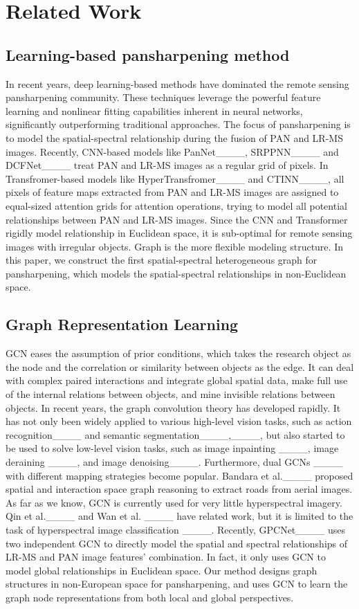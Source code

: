 \section{Related Work}
\subsection{Learning-based pansharpening method}

In recent years, deep learning-based methods have dominated the remote sensing pansharpening community. These techniques leverage the powerful feature learning and nonlinear fitting capabilities inherent in neural networks, significantly outperforming traditional approaches. The focus of pansharpening is to model the spatial-spectral relationship during the fusion of PAN and LR-MS images. Recently, CNN-based models like PanNet____, SRPPNN____ and DCFNet____ treat PAN and LR-MS images as a regular grid of pixels. In Transfromer-based models like HyperTransfromer____ and CTINN____, all pixels of feature maps extracted from PAN and LR-MS images are assigned to equal-sized attention grids
for attention operations, trying to model all potential relationships between PAN and LR-MS images. Since the CNN and Transformer rigidly model relationship in Euclidean space, it is sub-optimal for remote sensing images with irregular objects. Graph is the more flexible modeling structure. In this paper, we construct the first spatial-spectral heterogeneous graph for pansharpening, which models the spatial-spectral relationships in non-Euclidean space.

\subsection{Graph Representation Learning}
GCN eases the assumption of prior conditions, which takes the research object as the node and the correlation or similarity between objects as the edge. It can deal with complex paired interactions and integrate global spatial data, make full use of the internal relations between objects, and mine invisible relations between objects.
In recent years, the graph convolution theory has developed
rapidly. It has not only been widely applied to various high-level vision tasks, such as action recognition____ and semantic segmentation____,____, but also started to be used to solve low-level vision tasks, such as image inpainting ____, image deraining ____, and image denoising____. Furthermore, dual GCNs ____ with different mapping strategies become popular. Bandara et al.____ proposed spatial and interaction space graph reasoning to extract roads from aerial images. As far as we know, GCN is currently used for very little hyperspectral imagery. Qin et al.____ and Wan et al. ____ have related work, but it is limited to the task of hyperspectral image classification ____. Recently, GPCNet____ uses two independent GCN to directly model the spatial and spectral relationships of LR-MS and PAN image features' combination. In fact, it only uses GCN to model global relationships in Euclidean space. Our method designs graph structures in non-European space for pansharpening, and uses GCN to learn the graph node representations from both local and global perspectives.